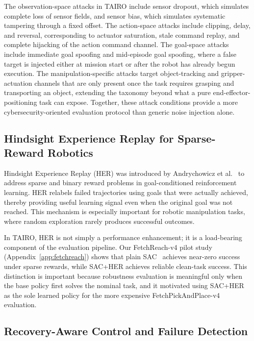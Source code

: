 \documentclass[conference]{IEEEtran}
\begin{document}
The observation-space attacks in TAIRO include sensor dropout, which simulates complete
loss of sensor fields, and sensor bias, which simulates systematic tampering through a
fixed offset. The action-space attacks include clipping, delay, and reversal,
corresponding to actuator saturation, stale command replay, and complete hijacking of
the action command channel. The goal-space attacks include immediate goal spoofing and
mid-episode goal spoofing, where a false target is injected either at mission start or
after the robot has already begun execution. The manipulation-specific attacks target
object-tracking and gripper-actuation channels that are only present once the task
requires grasping and transporting an object, extending the taxonomy beyond what a
pure end-effector-positioning task can expose. Together, these attack conditions provide
a more cybersecurity-oriented evaluation protocol than generic noise injection alone.

\subsection{Hindsight Experience Replay for Sparse-Reward Robotics}

Hindsight Experience Replay (HER) was introduced by Andrychowicz et
al.~\cite{andrychowicz2017hindsight} to address sparse and binary reward problems in
goal-conditioned reinforcement learning. HER relabels failed trajectories using goals
that were actually achieved, thereby providing useful learning signal even when the
original goal was not reached. This mechanism is especially important for robotic
manipulation tasks, where random exploration rarely produces successful outcomes.

In TAIRO, HER is not simply a performance enhancement; it is a load-bearing component of
the evaluation pipeline. Our FetchReach-v4 pilot study (Appendix~\ref{app:fetchreach})
shows that plain SAC~\cite{haarnoja2018soft} achieves near-zero success under sparse
rewards, while SAC+HER achieves reliable clean-task success. This distinction is
important because robustness evaluation is meaningful only when the base policy first
solves the nominal task, and it motivated using SAC+HER as the sole learned policy for
the more expensive FetchPickAndPlace-v4 evaluation.

\subsection{Recovery-Aware Control and Failure Detection}
\end{document}
